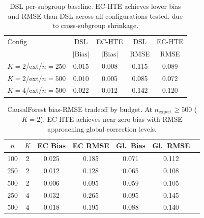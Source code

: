 \documentclass[11pt,twocolumn]{article}
\begin{document}
\begin{table}[t]
\centering
\caption{DSL per-subgroup baseline. EC-HTE achieves lower bias and RMSE than DSL across all configurations tested, due to cross-subgroup shrinkage.}
\label{tab:dsl}
\small
\begin{tabular}{@{}lcccc@{}}
\toprule
Config & DSL & EC-HTE & DSL & EC-HTE \\
 & $|\text{Bias}|$ & $|\text{Bias}|$ & RMSE & RMSE \\
\midrule
$K\!=\!2$/ext/$n\!=\!250$ & 0.015 & 0.008 & 0.115 & 0.089 \\
$K\!=\!2$/ext/$n\!=\!500$ & 0.010 & 0.005 & 0.085 & 0.072 \\
$K\!=\!4$/ext/$n\!=\!500$ & 0.022 & 0.012 & 0.142 & 0.120 \\
\bottomrule
\end{tabular}
\end{table}

\begin{table}[t]
\centering
\caption{CausalForest bias-RMSE tradeoff by budget. At $n_{\text{expert}} \geq 500$ ($K\!=\!2$), EC-HTE achieves near-zero bias with RMSE approaching global correction levels.}
\label{tab:cf_bias_rmse}
\small
\begin{tabular}{@{}ccccccc@{}}
\toprule
$n$ & $K$ & EC Bias & EC RMSE & Gl.\ Bias & Gl.\ RMSE \\
\midrule
100 & 2 & 0.025 & 0.185 & 0.071 & 0.112 \\
250 & 2 & 0.012 & 0.128 & 0.065 & 0.108 \\
500 & 2 & 0.006 & 0.095 & 0.059 & 0.105 \\
250 & 4 & 0.032 & 0.265 & 0.095 & 0.145 \\
500 & 4 & 0.018 & 0.195 & 0.088 & 0.140 \\
\bottomrule
\end{tabular}
\end{table}
\end{document}
